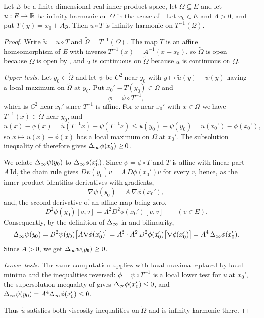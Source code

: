 \begin{lemma}
Let $E$ be a finite-dimensional real inner-product space, let $\Omega\subseteq E$
and let $u:E\to\mathbb{R}$ be infinity-harmonic on $\Omega$ in the sense of
. Let $x_0\in E$ and $A>0$, and put $T(y)=x_0+Ay$.
Then $u\circ T$ is infinity-harmonic on $T^{-1}(\Omega)$.
\end{lemma}
\begin{proof}
Write $\widetilde u=u\circ T$ and $\widetilde\Omega=T^{-1}(\Omega)$. The map $T$
is an affine homeomorphism of $E$ with inverse $T^{-1}(x)=A^{-1}(x-x_0)$, so
$\widetilde\Omega$ is open because $\Omega$ is open by
, and $\widetilde u$ is continuous on
$\widetilde\Omega$ because $u$ is continuous on $\Omega$.

\emph{Upper tests.} Let $y_0\in\widetilde\Omega$ and let $\psi$ be $C^2$ near
$y_0$ with $y\mapsto\widetilde u(y)-\psi(y)$ having a local maximum on
$\widetilde\Omega$ at $y_0$. Put $x_0'=T(y_0)\in\Omega$ and
\[
  \phi=\psi\circ T^{-1},
\]
which is $C^2$ near $x_0'$ since $T^{-1}$ is affine. For $x$ near $x_0'$ with
$x\in\Omega$ we have $T^{-1}(x)\in\widetilde\Omega$ near $y_0$, and
\[
  u(x)-\phi(x)=\widetilde u(T^{-1}x)-\psi(T^{-1}x)
    \le\widetilde u(y_0)-\psi(y_0)=u(x_0')-\phi(x_0'),
\]
so $x\mapsto u(x)-\phi(x)$ has a local maximum on $\Omega$ at $x_0'$. The
subsolution inequality of  therefore gives
$\Delta_{\infty}\phi(x_0')\ge0$.

We relate $\Delta_{\infty}\psi(y_0)$ to $\Delta_{\infty}\phi(x_0')$. Since $\psi=\phi\circ T$ and
$T$ is affine with linear part $A\,\mathrm{Id}$, the chain rule gives
$D\psi(y_0)v=A\,D\phi(x_0')v$ for every $v$, hence, as the inner product
identifies derivatives with gradients,
\[
  \nabla\psi(y_0)=A\,\nabla\phi(x_0'),
\]
and, the second derivative of an affine map being zero,
\[
  D^2\psi(y_0)[v,v]=A^2D^2\phi(x_0')[v,v]\qquad(v\in E).
\]
Consequently, by the definition of $\Delta_{\infty}$ in  and bilinearity,
\[
  \Delta_{\infty}\psi(y_0)=D^2\psi(y_0)\bigl[A\nabla\phi(x_0')\bigr]
    =A^2\cdot A^2\,D^2\phi(x_0')\bigl[\nabla\phi(x_0')\bigr]
    =A^4\,\Delta_{\infty}\phi(x_0').
\]
Since $A>0$, we get $\Delta_{\infty}\psi(y_0)\ge0$.

\emph{Lower tests.} The same computation applies with local maxima replaced by
local minima and the inequalities reversed: $\phi=\psi\circ T^{-1}$ is a local
lower test for $u$ at $x_0'$, the supersolution inequality of
 gives $\Delta_{\infty}\phi(x_0')\le0$, and
$\Delta_{\infty}\psi(y_0)=A^4\Delta_{\infty}\phi(x_0')\le0$.

Thus $\widetilde u$ satisfies both viscosity inequalities on
$\widetilde\Omega$ and is infinity-harmonic there.
\end{proof}
